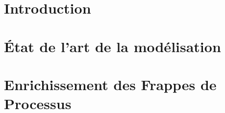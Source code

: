 \documentclass[fleqn,8pt,t]{beamer}
\begin{document}
\newcommand{\planPHstandard}[1][]{%
  \draw[very thick, draw=gray, fill=gray!10, #1] (0,-2.5) ellipse (1.7 and 1)
    node[text width=4cm, align=center] {Frappes de Processus\\standards};}
\newcommand{\planPHp}[1][]{%
  \draw[very thick, draw=blue, fill=blue!10, #1] (0,2) ellipse (2.5 and 1.5)
    node[text width=4cm, align=center, yshift=.5cm] {Frappes de Processus\\avec classes de priorités};}
\newcommand{\planPHcanonique}[1][]{%
  \draw[very thick, draw=red, fill=red!10, #1] (0,1.3) ellipse (1.8 and .5)
    node[text width=4cm, align=center, yshift=-.1cm] {Frappes de Processus\\canoniques};}
\newcommand{\planPHan}[1][]{%
  \draw[very thick, draw=darkgreen, fill=darkgreen!10, #1] (-3.5,0) ellipse (1.7 and 1)
    node[text width=4cm, align=center] {Frappes de Processus\\avec arcs neutralisants};}
\newcommand{\planPHmult}[1][]{%
  \draw[very thick, draw=violet, fill=violet!10, #1] (3.5,0) ellipse (1.7 and 1)
    node[text width=4cm, align=center] {Frappes de Processus\\avec actions plurielles};}
\newcommand{\planPHstandardligne}{
  \draw[very thick, draw=gray, bend left=30] (-5,-2.7) edge (5,-2.7);}



\section{Introduction}


\section{État de l'art de la modélisation}







\section{Enrichissement des Frappes de Processus}

\end{document}
